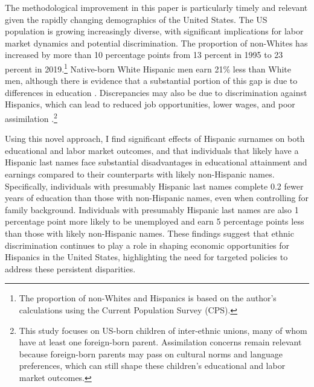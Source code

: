 The methodological improvement in this paper is particularly timely and relevant given the rapidly changing demographics of the United States. The US population is growing increasingly diverse, with significant implications for labor market dynamics and potential discrimination. The proportion of non-Whites has increased by more than 10 percentage points from 13 percent in 1995 to 23 percent in 2019.\footnote{The proportion of non-Whites and Hispanics is based on the author's calculations using the Current Population Survey (CPS).} Native-born White Hispanic men earn 21\% less than White men, although there is evidence that a substantial portion of this gap is due to differences in education \autocite{duncan2006hispanics, duncan2018identifying, duncan2018socioeconomic}. Discrepancies may also be due to discrimination against Hispanics, which can lead to reduced job opportunities, lower wages, and poor assimilation \autocite{chettyWhereLandOpportunity2014,bowles2002inheritance, djajic2003assimilation}.\footnote{This study focuses on US-born children of inter-ethnic unions, many of whom have at least one foreign-born parent. Assimilation concerns remain relevant because foreign-born parents may pass on cultural norms and language preferences, which can still shape these children's educational and labor market outcomes.}

Using this novel approach, I find significant effects of Hispanic surnames on both educational and labor market outcomes, and that individuals that likely have a Hispanic last names face substantial disadvantages in educational attainment and earnings compared to their counterparts with likely non-Hispanic names. Specifically, individuals with presumably Hispanic last names complete 0.2 fewer years of education than those with non-Hispanic names, even when controlling for family background. Individuals with presumably Hispanic last names are also 1 percentage point more likely to be unemployed and earn 5 percentage points less than those with likely non-Hispanic names. These findings suggest that ethnic discrimination continues to play a role in shaping economic opportunities for Hispanics in the United States, highlighting the need for targeted policies to address these persistent disparities.

